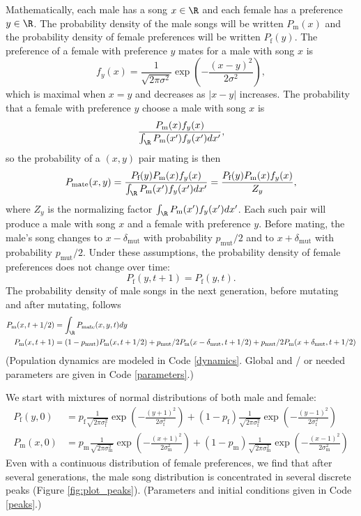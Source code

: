 \documentclass{article}
\begin{document}
Mathematically, each male has a song $x\in \R$ and each female has a preference $y\in\R$. The probability density of the male songs will be written $P_\text{m}(x)$ and the probability density of female preferences will be written $P_\text{f}(y)$. The preference of a female with preference $y$ mates for a male with song $x$ is 
\begin{equation*}
f_y(x)=\frac{1}{\sqrt{2 \pi \sigma^2}}\exp\left(-\frac{(x-y)^2}{2\sigma^2}\right),
\end{equation*}
which is maximal when $x=y$ and decreases as $|x-y|$ increases. The probability that a female with preference $y$ choose a male with song $x$ is 
\begin{equation*}
\frac{P_\text{m}(x)f_y(x)}{\int_\R P_\text{m}(x')f_y(x')dx'},
\end{equation*}
so the probability of a $(x,y)$ pair mating is then
\begin{equation*}
P_\text{mate}(x,y)=\frac{P_\text{f}(y)P_\text{m}(x)f_y(x)}{\int_\R P_\text{m}(x')f_y(x')dx'}=\frac{P_\text{f}(y)P_\text{m}(x)f_y(x)}{Z_y},
\end{equation*}
where $Z_y$ is the normalizing factor $\int_\R P_\text{m}(x')f_y(x')dx'$.
Each such pair will produce a male with song $x$ and a female with preference $y$. Before mating, the male's song changes to $x-\delta_\text{mut}$ with probability $p_\text{mut}/2$ and to $x+\delta_\text{mut}$ with probability $p_\text{mut}/2$. Under these assumptions, the probability density of female preferences does not change over time:
\begin{equation*}
P_\text{f}(y,t+1)=P_\text{f}(y,t).
\end{equation*}
The probability density of male songs in the next generation, before mutating and after mutating, follows
\begin{align*}
P_\text{m}(x,t+1/2)&=\int_\R P_\text{mate}(x,y,t) dy
\\P_\text{m}(x,t+1)&=(1-p_\text{mut})P_\text{m}(x,t+1/2)+p_\text{mut}/2P_\text{m}(x-\delta_\text{mut},t+1/2)+p_\text{mut}/2P_\text{m}(x+\delta_\text{mut},t+1/2)
\end{align*}
 (Population dynamics are modeled in Code \ref{dynamics}. Global and / or needed parameters are given in Code \ref{parameters}.)

We start with mixtures of normal distributions of both male and female:
\begin{align*}
P_\text{f}(y,0)&=p_\text{f}\frac{1}{\sqrt{2\pi\sigma_\text{f}^2}}\exp\left(-\frac{(y+1)^2}{2\sigma_\text{f}^2}\right)+(1-p_\text{f})\frac{1}{\sqrt{2\pi\sigma_\text{f}^2}}\exp\left(-\frac{(y-1)^2}{2\sigma_\text{f}^2}\right)
\\P_\text{m}(x,0)&=p_\text{m}\frac{1}{\sqrt{2\pi\sigma_\text{m}^2}}\exp\left(-\frac{(x+1)^2}{2\sigma_\text{m}^2}\right)+(1-p_\text{m})\frac{1}{\sqrt{2\pi\sigma_\text{m}^2}}\exp\left(-\frac{(x-1)^2}{2\sigma_\text{m}^2}\right)
\end{align*}
Even with a continuous distribution of female preferences, we find that after several generations, the male song distribution is concentrated in several discrete peaks (Figure \ref{fig:plot_peaks}). (Parameters and initial conditions given in Code \ref{peaks}.)
\end{document}
